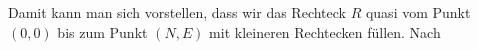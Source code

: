 Damit kann man sich vorstellen, dass wir das Rechteck $R$ quasi vom Punkt $(0,0)$ bis zum Punkt
$(N, E)$ mit kleineren Rechtecken füllen. Nach 

\begin{figure}[h]
\centering

\end{figure}







